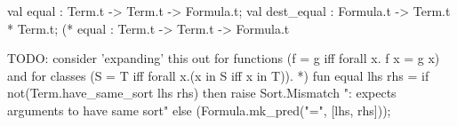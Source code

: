 \nwenddocs{}\plusendmoddef\nwstartdeflinemarkup{}\nwenddeflinemarkup
val equal : Term.t -> Term.t -> Formula.t;
val dest_equal : Formula.t -> Term.t * Term.t;
\nwendcode{}\nwdocspar
\nwenddocs{}\endmoddef\nwstartdeflinemarkup{}\nwenddeflinemarkup
(* equal : Term.t -> Term.t -> Formula.t

TODO: consider 'expanding' this out for functions
 (f = g iff forall x. f x = g x) and for classes
 (S = T iff forall x.(x in S iff x in T)). *)
fun equal lhs rhs =
  if not(Term.have_same_sort lhs rhs)
  then raise Sort.Mismatch ": expects arguments to have same sort"
  else (Formula.mk_pred("=", [lhs, rhs]));

